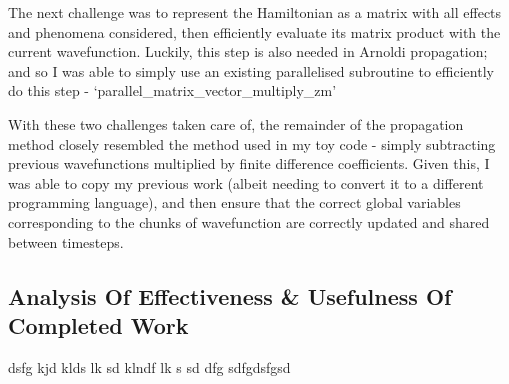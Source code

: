 The next challenge was to represent the Hamiltonian as a matrix with all effects and phenomena considered, then efficiently evaluate its matrix product with the current wavefunction. Luckily, this step is also needed in Arnoldi propagation; and so I was able to simply use an existing parallelised subroutine to efficiently do this step - `parallel\_matrix\_vector\_multiply\_zm' 

With these two challenges taken care of, the remainder of the propagation method closely resembled the method used in my toy code - simply subtracting previous wavefunctions multiplied by finite difference coefficients. Given this, I was able to copy my previous work (albeit needing to convert it to a different programming language), and then ensure that the correct global variables corresponding to the chunks of wavefunction are correctly updated and shared between timesteps.

\subsection{Analysis Of Effectiveness \& Usefulness Of Completed Work}
dsfg kjd klds lk
sd klndf lk s
sd dfg sdfgdsfgsd


